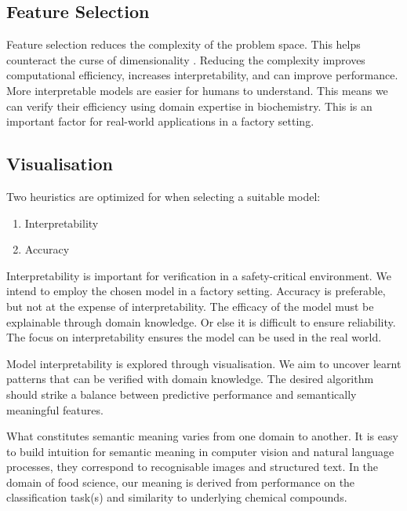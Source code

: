 \documentclass{article}
\begin{document}
\subsection{Feature Selection}
\label{sec:background-feature-selection}

Feature selection reduces the complexity of the problem space.
This helps counteract the curse of dimensionality \cite{koppen2000curse}.
Reducing the complexity improves computational efficiency, increases interpretability, and can improve performance.
More interpretable models are easier for humans to understand.
This means we can verify their efficiency using domain expertise in biochemistry.
This is an important factor for real-world applications in a factory setting.

\subsection{Visualisation}
\label{sec:background-visualisation}

Two heuristics are optimized for when selecting a suitable model:

\begin{enumerate}
  \item Interpretability
  \item Accuracy
\end{enumerate}

Interpretability is important for verification in a safety-critical environment.
We intend to employ the chosen model in a factory setting.
Accuracy is preferable, but not at the expense of interpretability.
The efficacy of the model must be explainable through domain knowledge.
Or else it is difficult to ensure reliability.
The focus on interpretability ensures the model can be used in the real world.

Model interpretability is explored through visualisation.
We aim to uncover learnt patterns that can be verified with domain knowledge.
The desired algorithm should strike a balance between predictive performance and semantically meaningful features.

What constitutes semantic meaning varies from one domain to another.
It is easy to build intuition for semantic meaning in computer vision and natural language processes, they correspond to recognisable images and structured text.
In the domain of food science, our meaning is derived from performance on the classification task(s) and similarity to underlying chemical compounds.
\end{document}
